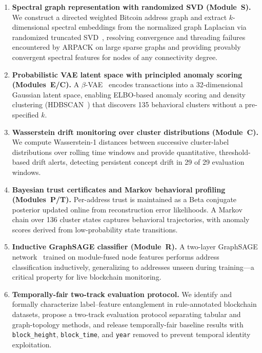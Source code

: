 \begin{enumerate}[leftmargin=*, label=\textbf{C\arabic*}]

  \item \textbf{Spectral graph representation with randomized SVD
    (Module~S).}
    We construct a directed weighted Bitcoin address graph and extract
    $k$-dimensional spectral embeddings from the normalized graph Laplacian
    via randomized truncated SVD~\cite{Halko2011}, resolving convergence and
    threading failures encountered by ARPACK on large sparse graphs and
    providing provably convergent spectral features for nodes of any
    connectivity degree.

  \item \textbf{Probabilistic VAE latent space with principled anomaly
    scoring (Modules~E/C).}
    A $\beta$-VAE~\cite{Kingma2014} encodes transactions into a
    \num{32}-dimensional Gaussian latent space, enabling ELBO-based anomaly
    scoring and density clustering (HDBSCAN~\cite{McInnes2017}) that
    discovers \num{135} behavioral clusters without a pre-specified $k$.

  \item \textbf{Wasserstein drift monitoring over cluster distributions
    (Module~C).}
    We compute Wasserstein-1 distances between successive cluster-label
    distributions over rolling time windows and provide quantitative,
    threshold-based drift alerts, detecting persistent concept drift in
    \num{29} of \num{29} evaluation windows.

  \item \textbf{Bayesian trust certificates and Markov behavioral profiling
    (Modules~P/T).}
    Per-address trust is maintained as a Beta conjugate posterior updated
    online from reconstruction error likelihoods.
    A Markov chain over \num{136} cluster states captures behavioral
    trajectories, with anomaly scores derived from low-probability
    state transitions.

  \item \textbf{Inductive GraphSAGE classifier (Module~R).}
    A two-layer GraphSAGE network~\cite{Hamilton2017} trained on
    module-fused node features performs address classification inductively,
    generalizing to addresses unseen during training---a critical property
    for live blockchain monitoring.

  \item \textbf{Temporally-fair two-track evaluation protocol.}
    We identify and formally characterize label--feature entanglement in
    rule-annotated blockchain datasets, propose a two-track evaluation
    protocol separating tabular and graph-topology methods, and release
    temporally-fair baseline results with \texttt{block\_height},
    \texttt{block\_time}, and \texttt{year} removed to prevent temporal
    identity exploitation.


\end{enumerate}
